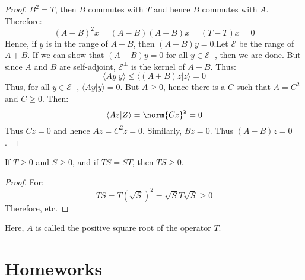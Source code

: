 \begin{proof}
            $B^{2}=T$, then $B$ commutes with $T$ and hence
            $B$ commutes with $A$. Therefore:
            \begin{equation}
                (A-B)^{2}x=(A-B)(A+B)x=(T-T)x=0
            \end{equation}
            Hence, if $y$ is in the range of $A+B$, then
            $(A-B)y=0$.Let $\mathcal{E}$ be the range of $A+B$.
            If we can show that $(A-B)y=0$ for all
            $y\in\mathcal{E}^{\perp}$, then we are done. But since
            $A$ and $B$ are self-adjoint, $\mathcal{E}^{\perp}$
            is the kernel of $A+B$. Thus:
            \begin{equation}
                \langle{Ay|y}\rangle\leq
                \langle{(A+B)z|z}\rangle=0
            \end{equation}
            Thus, for all $y\in\mathcal{E}^{\perp}$,
            $\langle{Ay|y}\rangle=0$. But $A\geq{0}$, hence there
            is a $C$ such that $A=C^{2}$ and $C\geq{0}$.
            Then:
            \begin{equation}
                \langle{Az|Z}\rangle=\norm{Cz}^{2}=0
            \end{equation}
            Thus $Cz=0$ and hence $Az=C^{2}z=0$. Similarly,
            $Bz=0$. Thus $(A-B)z=0$.
        \end{proof}
        \begin{theorem}
            If $T\geq{0}$ and $S\geq{0}$, and if
            $TS=ST$, then $TS\geq{0}$.
        \end{theorem}
        \begin{proof}
            For:
            \begin{equation}
                TS=T(\sqrt{S})^{2}=\sqrt{S}T\sqrt{S}\geq{0}
            \end{equation}
            Therefore, etc.
        \end{proof}
        Here, $A$ is called the positive square root of the
        operator $T$.
    \clearpage
    \printglossary[style=longpara]
    \chapter{Homeworks}
